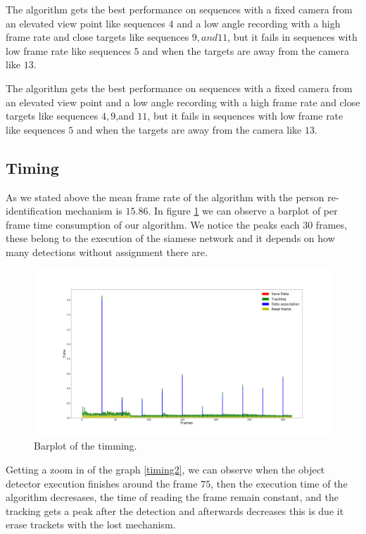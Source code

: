 \documentclass[12pt, a4paper, titlepage,twoside,openright]{article}
\begin{document}
The algorithm gets the best performance on sequences with a fixed camera from an elevated view point like sequences $4$ and a low angle recording with a high frame rate and close targets like sequences $9,and 11$, but it fails in sequences with low frame rate like sequences $5$ and when the targets are away from the camera like $13$.

The algorithm gets the best performance on sequences with a fixed camera from an elevated view point and a low angle recording with a high frame rate and close targets like sequences $4,9$,and $11$, but it fails in sequences with low frame rate like sequences $5$ and when the targets are away from the camera like $13$.


\subsection{Timing}


As we stated above the mean frame rate of the algorithm with the person re-identification mechanism is $15.86$. In figure \ref{timing1} we can observe a barplot of per frame time consumption of our algorithm.  We notice the peaks each $30$ frames, these belong to the execution of the siamese network and it depends on how many detections without assignment there are.

\begin{figure}[H]
\centering         
\includegraphics[width=0.9\linewidth]{graphicsRearrange/temps/timeGenral.png}
\caption{Barplot of the timming.} \label{timing1}
\end{figure}

Getting a zoom in of the graph \ref{timing2}, we can observe when the object detector execution finishes around the frame $75$, then the execution time of the algorithm decresases, the time of reading the frame remain constant, and the tracking gets a peak after the detection and afterwards decreases this is due it erase trackets with the lost mechanism. 
\end{document}
